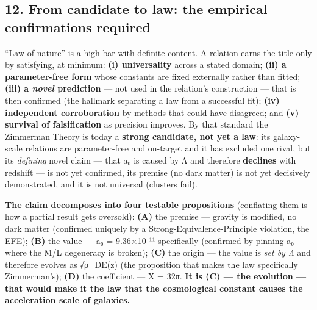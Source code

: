 \documentclass[
]{article}
\begin{document}
\subsection{12. From candidate to law: the empirical confirmations
required}\label{from-candidate-to-law-the-empirical-confirmations-required}

``Law of nature'' is a high bar with definite content. A relation earns
the title only by satisfying, at minimum: \textbf{(i) universality}
across a stated domain; \textbf{(ii) a parameter-free form} whose
constants are fixed externally rather than fitted; \textbf{(iii) a
\emph{novel} prediction} --- not used in the relation's construction ---
that is then confirmed (the hallmark separating a law from a successful
fit); \textbf{(iv) independent corroboration} by methods that could have
disagreed; and \textbf{(v) survival of falsification} as precision
improves. By that standard the Zimmerman Theory is today a
\textbf{strong candidate, not yet a law}: its galaxy-scale relations are
parameter-free and on-target and it has excluded one rival, but its
\emph{defining} novel claim --- that a₀ is caused by Λ and therefore
\textbf{declines} with redshift --- is not yet confirmed, its premise
(no dark matter) is not yet decisively demonstrated, and it is not
universal (clusters fail).

\textbf{The claim decomposes into four testable propositions}
(conflating them is how a partial result gets oversold): \textbf{(A)}
the premise --- gravity is modified, no dark matter (confirmed uniquely
by a Strong-Equivalence-Principle violation, the EFE); \textbf{(B)} the
value --- a₀ = 9.36×10⁻¹¹ specifically (confirmed by pinning a₀ where
the M/L degeneracy is broken); \textbf{(C)} the origin --- the value is
\emph{set by Λ} and therefore evolves as √ρ\_DE(z) (the proposition that
makes the law specifically Zimmerman's); \textbf{(D)} the coefficient
--- X = 32π. \textbf{It is (C) --- the evolution --- that would make it
the law that the cosmological constant causes the acceleration scale of
galaxies.}
\end{document}
